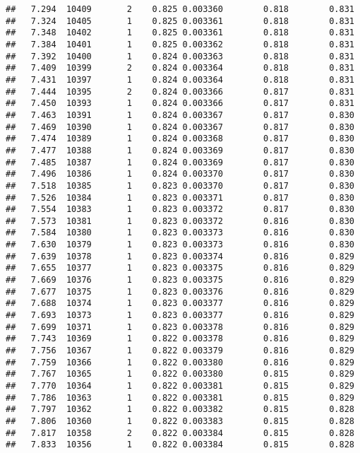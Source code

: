 \documentclass[
]{book}
\begin{document}
\begin{verbatim}
##   7.294  10409       2    0.825 0.003360        0.818        0.831
##   7.324  10405       1    0.825 0.003361        0.818        0.831
##   7.348  10402       1    0.825 0.003361        0.818        0.831
##   7.384  10401       1    0.825 0.003362        0.818        0.831
##   7.392  10400       1    0.824 0.003363        0.818        0.831
##   7.409  10399       2    0.824 0.003364        0.818        0.831
##   7.431  10397       1    0.824 0.003364        0.818        0.831
##   7.444  10395       2    0.824 0.003366        0.817        0.831
##   7.450  10393       1    0.824 0.003366        0.817        0.831
##   7.463  10391       1    0.824 0.003367        0.817        0.830
##   7.469  10390       1    0.824 0.003367        0.817        0.830
##   7.474  10389       1    0.824 0.003368        0.817        0.830
##   7.477  10388       1    0.824 0.003369        0.817        0.830
##   7.485  10387       1    0.824 0.003369        0.817        0.830
##   7.496  10386       1    0.824 0.003370        0.817        0.830
##   7.518  10385       1    0.823 0.003370        0.817        0.830
##   7.526  10384       1    0.823 0.003371        0.817        0.830
##   7.554  10383       1    0.823 0.003372        0.817        0.830
##   7.573  10381       1    0.823 0.003372        0.816        0.830
##   7.584  10380       1    0.823 0.003373        0.816        0.830
##   7.630  10379       1    0.823 0.003373        0.816        0.830
##   7.639  10378       1    0.823 0.003374        0.816        0.829
##   7.655  10377       1    0.823 0.003375        0.816        0.829
##   7.669  10376       1    0.823 0.003375        0.816        0.829
##   7.677  10375       1    0.823 0.003376        0.816        0.829
##   7.688  10374       1    0.823 0.003377        0.816        0.829
##   7.693  10373       1    0.823 0.003377        0.816        0.829
##   7.699  10371       1    0.823 0.003378        0.816        0.829
##   7.743  10369       1    0.822 0.003378        0.816        0.829
##   7.756  10367       1    0.822 0.003379        0.816        0.829
##   7.759  10366       1    0.822 0.003380        0.816        0.829
##   7.767  10365       1    0.822 0.003380        0.815        0.829
##   7.770  10364       1    0.822 0.003381        0.815        0.829
##   7.786  10363       1    0.822 0.003381        0.815        0.829
##   7.797  10362       1    0.822 0.003382        0.815        0.828
##   7.806  10360       1    0.822 0.003383        0.815        0.828
##   7.817  10358       2    0.822 0.003384        0.815        0.828
##   7.833  10356       1    0.822 0.003384        0.815        0.828

\end{verbatim}
\end{document}
